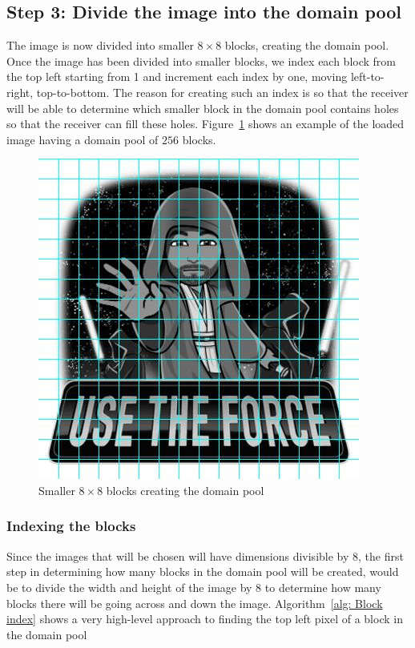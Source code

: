 \documentclass[10pt,twocolumn, a4paper]{witseiepaper}
\begin{document}
\subsection{Step 3: Divide the image into the domain pool}
\label{sec: Step 3}
The image is now divided into smaller $8\times 8$ blocks, creating the domain pool. Once the image has been divided into smaller blocks, we index each block from the top left starting from 1 and increment each index by one, moving left-to-right, top-to-bottom. The reason for creating such an index is so that the receiver will be able to determine which smaller block in the domain pool contains holes so that the receiver can fill these holes. Figure~\ref{fig: Step 3} shows an example of the loaded image having a domain pool of $256$ blocks.
\begin{figure}[h!]
\renewcommand{\thefigure}{\arabic{figure}}
\centering
\includegraphics[scale=0.7, frame]{Step3.jpg}
\caption{Smaller $8\times 8$ blocks creating the domain pool}
\label{fig: Step 3}
\end{figure}

\subsubsection{Indexing the blocks}
\label{sec: Index Block}
Since the images that will be chosen will have dimensions divisible by 8, the first step in determining how many blocks in the domain pool will be created, would be to divide the width and height of the image by 8 to determine how many blocks there will be going across and down the image. Algorithm~\ref{alg: Block index} shows a very high-level approach to finding the top left pixel of a block in the domain pool
\end{document}
